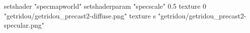 setshader "specmapworld"
setshaderparam "specscale" 0.5
texture 0 "getridou/getridou_precast2-diffuse.png"
texture s "getridou/getridou_precast2-specular.png"
